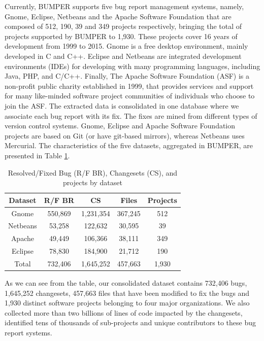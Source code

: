 \documentclass[12pt]{report}
\begin{document}
\label{sub:Bumper Data Repository}

Currently, BUMPER supports five bug report management systems, namely,
Gnome, Eclipse, Netbeans and the Apache Software Foundation that are
composed of 512, 190, 39 and 349 projects respectively, bringing the
total of projects supported by BUMPER to 1,930. These projects cover 16
years of development from 1999 to 2015. Gnome is a free desktop
environment, mainly developed in C and C++. Eclipse and Netbeans are
integrated development environments (IDEs) for developing with many
programming languages, including Java, PHP, and C/C++. Finally, The
Apache Software Foundation (ASF) is a non-profit public charity
established in 1999, that provides services and support for many
like-minded software project communities of individuals who choose to
join the ASF. The extracted data is consolidated in one database where
we associate each bug report with its fix. The fixes are mined from
different types of version control systems. Gnome, Eclipse and Apache
Software Foundation projects are based on Git (or have git-based
mirrors), whereas Netbeans uses Mercurial. The characteristics of the
five datasets, aggregated in BUMPER, are presented in Table
\ref{tab:summary-bumper}.

\begin{table}[]
\centering
\caption{Resolved/Fixed Bug (R/F BR), Changesets (CS), and projects by dataset}
\label{tab:summary-bumper}
\begin{tabular}{c|c|c|c|c}
\textbf{Dataset} & \textbf{R/F BR} & \textbf{CS} & \textbf{Files} & \textbf{Projects} \\ \hline \hline
Gnome            & 550,869         & 1,231,354   & 367,245        & 512                \\ \hline
Netbeans         & 53,258          & 122,632     & 30,595         & 39                \\ \hline
Apache           & 49,449          & 106,366     & 38,111         & 349               \\ \hline
Eclipse          & 78,830          & 184,900     & 21,712         & 190                \\ \hline \hline
Total            & 732,406         & 1,645,252   & 457,663        & 1,930               \\ \hline \hline
\end{tabular}
\end{table}

As we can see from the table, our consolidated dataset contains 732,406
bugs, 1,645,252 changesets, 457,663 files that have been modified to fix
the bugs and 1,930 distinct software projects belonging to four major
organizations. We also collected more than two billions of lines of code
impacted by the changesets, identified tens of thousands of sub-projects
and unique contributors to these bug report systems.
\end{document}
